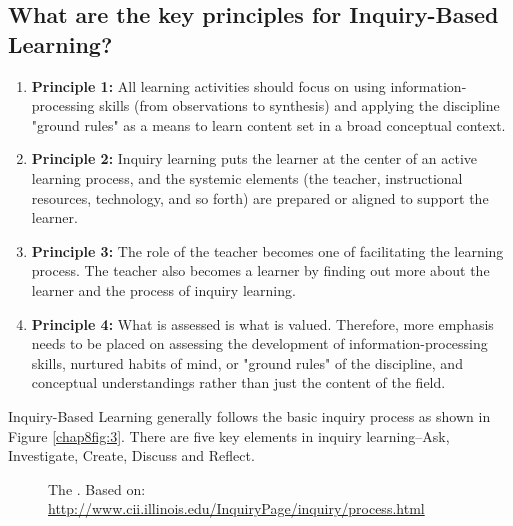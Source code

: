 \subsection*{What are the key principles for Inquiry-Based Learning?}
\begin{definition}
\begin{enumerate}
\item \textbf{Principle 1:} All learning activities should focus on using information-processing skills (from observations to synthesis) and applying the discipline "ground rules" as a means to learn content set in a
broad conceptual context.
\item \textbf{Principle 2:} Inquiry learning puts the learner at the center of an active learning process, and the systemic
elements (the teacher, instructional resources, technology, and so forth) are prepared or aligned to support the learner.
\item \textbf{Principle 3:} The role of the teacher becomes one of facilitating the learning process. The teacher also becomes a learner by finding out more about the learner and the process of inquiry learning.
\item \textbf{Principle 4:} What is assessed is what is valued. Therefore, more emphasis needs to be placed on assessing the development of information-processing skills, nurtured habits of mind, or "ground rules" of
the discipline, and conceptual understandings rather than just the content of the field.
\end{enumerate}
\end{definition}
Inquiry-Based Learning generally follows the basic inquiry process as shown in Figure \eqref{chap8fig:3}.
There are five key elements in inquiry learning--Ask, Investigate, Create, Discuss and Reflect.
\begin{figure}[!h]
\centering
{}
\caption[Basic Inquiry Process]{The . Based on: \url{http://www.cii.illinois.edu/InquiryPage/inquiry/process.html}}
\label{chap8fig:3}
\end{figure}
